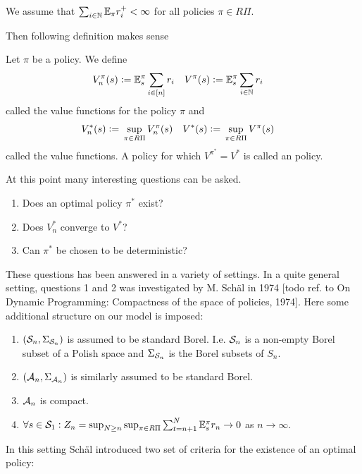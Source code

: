 \documentclass{article}
\begin{document}
\begin{asm}
  We assume that $\sum_{i \in \mathbb{N}} \mathbb{E}_\pi r^+_i < \infty$
  for all policies $\pi \in R\Pi$.
  \label{asm:generalE}
\end{asm}

Then following definition makes sense
\begin{defn} 
  Let $\pi$ be a policy.
  We define
  \begin{align*}
    V_n^\pi(s) \vcentcolon= & \; \mathbb{E}_s^\pi \sum_{i \in [n]} r_i &
    V^\pi(s) \vcentcolon= & \; \mathbb{E}_s^\pi \sum_{i \in \mathbb{N}} r_i
  \end{align*}
  called the  value functions for the policy $\pi$
  and
  \begin{align*}
    V_n^*(s) \vcentcolon= & \; \sup_{\pi \in R\Pi} V_n^\pi(s) &
    V^*(s) \vcentcolon= & \; \sup_{\pi \in R\Pi} V^\pi(s)
  \end{align*}
  called the  value functions.
  A policy for which $V^{\pi^*} = V^*$ is called an
   policy.
\end{defn}


At this point many interesting questions can be asked.
\begin{enumerate}
  \item Does an optimal policy $\pi^*$ exist?
  \item Does $V_n^*$ converge to $V^*$?
  \item Can $\pi^*$ be chosen to be deterministic?
\end{enumerate}

These questions has been answered in a variety of settings.
In a quite general setting, questions 1 and 2
was investigated by M. Schäl in 1974
[todo ref. to On Dynamic Programming:
Compactness of the space of policies, 1974].
Here some additional structure on our model is imposed:
\begin{sett}[Schäl]
  \begin{enumerate}
    \item $(\mathcal{S}_n, \Sigma_{\mathcal{S}_n})$ is assumed to be standard Borel.
      I.e. $\mathcal{S}_n$ is a non-empty Borel subset of a Polish space
      and $\Sigma_{\mathcal{S}_n}$ is the Borel subsets of $S_n$.
    \item $(\mathcal{A}_n, \Sigma_{\mathcal{A}_n})$ is similarly assumed to be
      standard Borel.
    \item $\mathcal{A}_n$ is compact.
    \item $\forall s \in \mathcal{S}_1 :
      Z_n = \sup_{N \geq n} \sup_{\pi \in R\Pi} \sum_{t=n+1}^N
      \mathbb{E}_s^\pi r_n \to 0$ as $n \to \infty$.
  \end{enumerate}
  \label{sett:Schal}
\end{sett}
In this setting Schäl introduced two set of criteria for the existence
of an optimal policy:
\end{document}
